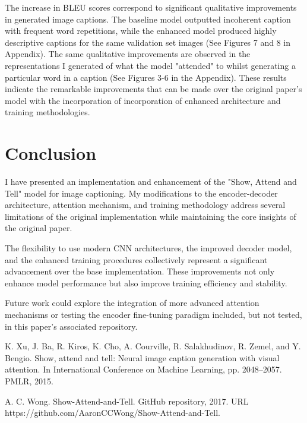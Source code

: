 \documentclass{article}
\theoremstyle{plain}
\theoremstyle{definition}
\theoremstyle{remark}
\begin{document}
The increase in BLEU scores correspond to significant qualitative improvements in generated image captions. The baseline model outputted incoherent caption with frequent word repetitions, while the enhanced model produced highly descriptive captions for the same validation set images (See Figures 7 and 8 in Appendix). The same qualitative improvements are observed in the representations I generated of what the model "attended" to whilst generating a particular word in a caption (See Figures 3-6 in the Appendix). These results indicate the remarkable improvements that can be made over the original paper's model with the incorporation of incorporation of enhanced architecture and training methodologies. 

\section{Conclusion}

I have presented an implementation and enhancement of the "Show, Attend and Tell" model for image captioning. My modifications to the encoder-decoder architecture, attention mechanism, and training methodology address several limitations of the original implementation while maintaining the core insights of the original paper.

The flexibility to use modern CNN architectures, the improved decoder model, and the enhanced training procedures collectively represent a significant advancement over the base implementation. These improvements not only enhance model performance but also improve training efficiency and stability.

Future work could explore the integration of more advanced attention mechanisms or testing the encoder fine-tuning paradigm included, but not tested, in this paper's associated repository.



K. Xu, J. Ba, R. Kiros, K. Cho, A. Courville, R. Salakhudinov, R. Zemel, and Y. Bengio. Show, attend and tell: Neural image caption generation with visual attention. In International Conference on Machine Learning, pp. 2048–2057. PMLR, 2015.

A. C. Wong. Show-Attend-and-Tell. GitHub repository, 2017. URL https://github.com/AaronCCWong/Show-Attend-and-Tell.



\newpage
\appendix
\onecolumn
\end{document}
